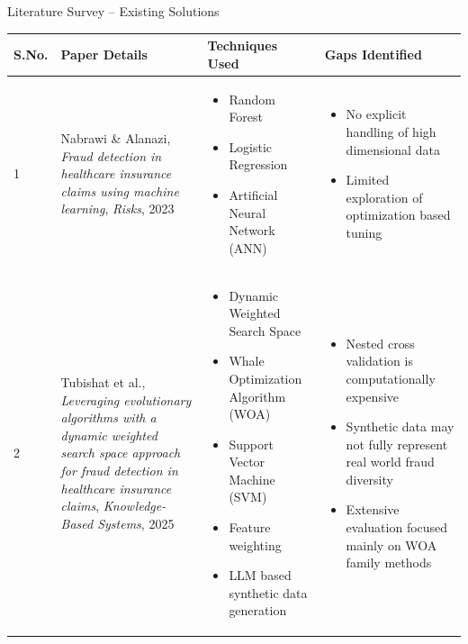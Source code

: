 \documentclass[aspectratio=169,11pt]{beamer}
\begin{document}
\begin{frame}{Literature Survey -- Existing Solutions}
\scriptsize

\begin{tabular}{p{}p{}p{}p{}}
\toprule
\textbf{S.No.} &
\textbf{Paper Details} &
\textbf{Techniques Used} &
\textbf{Gaps Identified} \\
\midrule

1 &
Nabrawi \& Alanazi, 
\emph{Fraud detection in healthcare insurance claims using machine learning},
\emph{Risks}, 2023 \cite{ref1}
&
\begin{itemize}
    \item Random Forest
    \item Logistic Regression
    \item Artificial Neural Network (ANN)
\end{itemize}
&
\begin{itemize}
    \item No explicit handling of high dimensional data
    \item Limited exploration of optimization based tuning
\end{itemize}
\\[2mm]

2 &
Tubishat et al.,
\emph{Leveraging evolutionary algorithms with a dynamic weighted search space approach for fraud detection in healthcare insurance claims},
\emph{Knowledge-Based Systems}, 2025  \cite{ref2}
&
\begin{itemize}
    \item Dynamic Weighted Search Space
    \item Whale Optimization Algorithm (WOA)
    \item Support Vector Machine (SVM)
    \item Feature weighting
    \item LLM based synthetic data generation
\end{itemize}
&
\begin{itemize}
    \item Nested cross validation is computationally expensive
    \item Synthetic data may not fully represent real world fraud diversity
    \item Extensive evaluation focused mainly on WOA family methods
\end{itemize}
\\[2mm]



\bottomrule
\end{tabular}
\end{frame}
\end{document}

